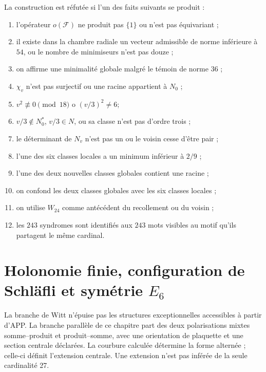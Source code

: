 \begin{criterion}
La construction est réfutée si l'un des faits
suivants se produit :
\begin{enumerate}
 \item l'opérateur \(o(\mathcal F)\) ne produit pas \(\{1\}\) ou n'est pas
       équivariant ;
 \item il existe dans la chambre radiale un vecteur admissible de norme inférieure à
       \(54\), ou le nombre de minimiseurs n'est pas douze ;
 \item on affirme une minimalité globale malgré le témoin de norme \(36\) ;
 \item \(\chi_v\) n'est pas surjectif ou une racine appartient à \(N_0\) ;
 \item \(v^2\not\equiv0\pmod{18}\) o \((v/3)^2\neq6\);
 \item \(v/3\notin N_0^*\), \(v/3\in N\), ou sa classe n'est pas d'ordre trois ;
 \item le déterminant de \(N_v\) n'est pas un ou le voisin cesse d'être pair ;
 \item l'une des six classes locales a un minimum inférieur à \(2/9\) ;
 \item l'une des deux nouvelles classes globales contient une racine ;
 \item on confond les deux classes globales avec les six classes locales ;
 \item on utilise \(W_{24}\) comme antécédent du recollement ou du voisin ;
 \item les \(243\) syndromes sont identifiés aux \(243\) mots
       visibles au motif qu'ils partagent le même cardinal.
\end{enumerate}
\end{criterion}


\section{Holonomie finie, configuration de Schläfli et symétrie \texorpdfstring{\(E_6\)}{E6}}
\label{p12-83-c20-s6:chap:holonomia-schlafli-e6-nuevo}

La branche de Witt n'épuise pas les structures exceptionnelles accessibles à partir d'APP. La branche parallèle de ce chapitre part des deux polarisations mixtes somme--produit et produit--somme, avec une orientation de plaquette et une section centrale déclarées. La courbure calculée détermine la forme alternée ; celle-ci définit l'extension centrale. Une extension n'est pas inférée de la seule cardinalité 27.

